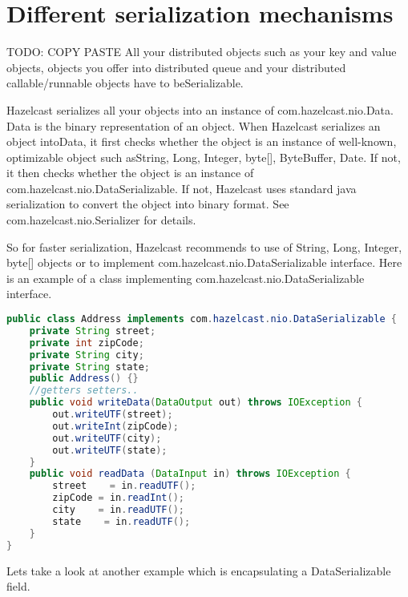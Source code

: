 \chapter{Different serialization mechanisms}
TODO: COPY PASTE
All your distributed objects such as your key and value objects, objects you offer into distributed queue and your distributed callable/runnable objects have to beSerializable.

Hazelcast serializes all your objects into an instance of com.hazelcast.nio.Data. Data is the binary representation of an object. When Hazelcast serializes an object intoData, it first checks whether the object is an instance of well-known, optimizable object such asString, Long, Integer, byte[], ByteBuffer, Date. If not, it then checks whether the object is an instance of com.hazelcast.nio.DataSerializable. If not, Hazelcast uses standard java serialization to convert the object into binary format. See com.hazelcast.nio.Serializer for details.

So for faster serialization, Hazelcast recommends to use of String, Long, Integer, byte[] objects or to implement com.hazelcast.nio.DataSerializable interface. Here is an example of a class implementing com.hazelcast.nio.DataSerializable interface.

\begin{lstlisting}[language=java]
public class Address implements com.hazelcast.nio.DataSerializable {
    private String street;
    private int zipCode;
    private String city;
    private String state;
    public Address() {}
    //getters setters..
    public void writeData(DataOutput out) throws IOException {
        out.writeUTF(street);
        out.writeInt(zipCode);
        out.writeUTF(city);
        out.writeUTF(state);
    }
    public void readData (DataInput in) throws IOException {
        street    = in.readUTF();
        zipCode = in.readInt();
        city    = in.readUTF();
        state    = in.readUTF();
    }
}
\end{lstlisting}

Lets take a look at another example which is encapsulating a DataSerializable field.


